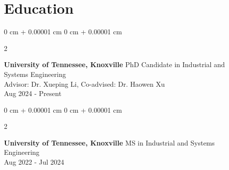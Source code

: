 \documentclass[10pt, letterpaper]{article}
\newenvironment{highlightsforbulletentries}{
    \begin{itemize}[
        topsep=0.10 cm,
        parsep=0.10 cm,
        partopsep=0pt,
        itemsep=0pt,
        leftmargin=10pt
    ]
}{
    \end{itemize}
} %
\newenvironment{onecolentry}{
    \begin{adjustwidth}{
        0 cm + 0.00001 cm
    }{
        0 cm + 0.00001 cm
    }
}{
    \end{adjustwidth}
} %
\newenvironment{twocolentry}[2][]{
    \onecolentry
    \def\secondColumn{#2}
    \setcolumnwidth{\fill, 4.5 cm}
    \begin{paracol}{2}
}{
    \switchcolumn \raggedleft \secondColumn
    \end{paracol}
    \endonecolentry
} %
\begin{document}



    










\section*{\small Education}
\begin{twocolentry}{Aug 2024 - Present}
    \small \textbf{University of Tennessee, Knoxville} \textbar PhD Candidate in Industrial and Systems Engineering \\
    Advisor: Dr. Xueping Li, Co-advised: Dr. Haowen Xu \\
\end{twocolentry}
\vspace{0.2cm} 
\begin{twocolentry}{Aug 2022 - Jul 2024}
    \small \textbf{University of Tennessee, Knoxville} \textbar MS in Industrial and Systems Engineering\\
\end{twocolentry}
\end{document}
